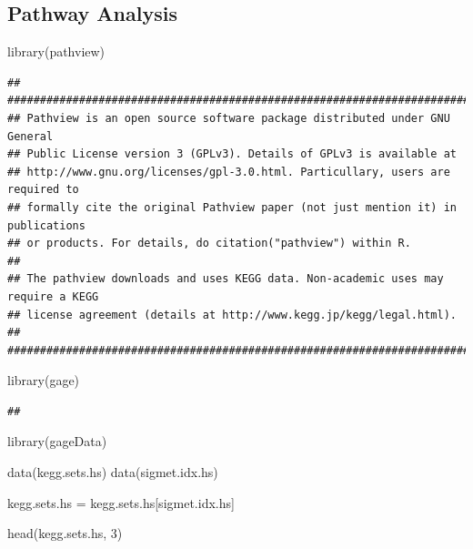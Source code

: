 \documentclass[
]{article}
\newenvironment{Shaded}{\begin{snugshade}}{\end{snugshade}}
\newcommand{\DecValTok}[1]{\textcolor[rgb]{0.00,0.00,0.81}{#1}}
\newcommand{\FunctionTok}[1]{\textcolor[rgb]{0.00,0.00,0.00}{#1}}
\newcommand{\NormalTok}[1]{#1}
\newcommand{\OtherTok}[1]{\textcolor[rgb]{0.56,0.35,0.01}{#1}}
\begin{document}
\hypertarget{pathway-analysis}{%
\subsection{Pathway Analysis}\label{pathway-analysis}}

\begin{Shaded}
\begin{Highlighting}[]
\FunctionTok{library}\NormalTok{(pathview)}
\end{Highlighting}
\end{Shaded}

\begin{verbatim}
## ##############################################################################
## Pathview is an open source software package distributed under GNU General
## Public License version 3 (GPLv3). Details of GPLv3 is available at
## http://www.gnu.org/licenses/gpl-3.0.html. Particullary, users are required to
## formally cite the original Pathview paper (not just mention it) in publications
## or products. For details, do citation("pathview") within R.
## 
## The pathview downloads and uses KEGG data. Non-academic uses may require a KEGG
## license agreement (details at http://www.kegg.jp/kegg/legal.html).
## ##############################################################################
\end{verbatim}

\begin{Shaded}
\begin{Highlighting}[]
\FunctionTok{library}\NormalTok{(gage)}
\end{Highlighting}
\end{Shaded}

\begin{verbatim}
## 
\end{verbatim}

\begin{Shaded}
\begin{Highlighting}[]
\FunctionTok{library}\NormalTok{(gageData)}
\end{Highlighting}
\end{Shaded}

\begin{Shaded}
\begin{Highlighting}[]
\FunctionTok{data}\NormalTok{(kegg.sets.hs)}
\FunctionTok{data}\NormalTok{(sigmet.idx.hs)}

\NormalTok{kegg.sets.hs }\OtherTok{=}\NormalTok{ kegg.sets.hs[sigmet.idx.hs]}

\FunctionTok{head}\NormalTok{(kegg.sets.hs, }\DecValTok{3}\NormalTok{)}
\end{Highlighting}
\end{Shaded}
\end{document}
